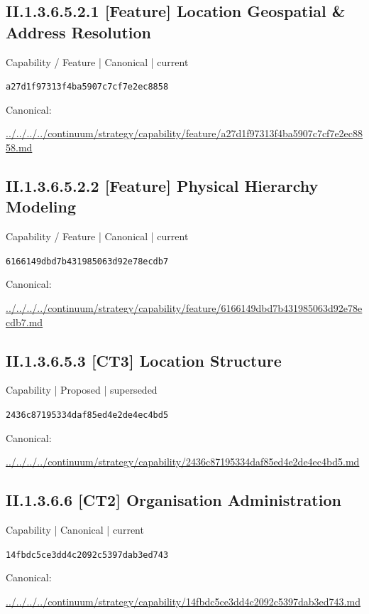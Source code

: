 \documentclass[10pt,a4paper]{article}
\begin{document}
\subsection*{II.1.3.6.5.2.1 [Feature] Location Geospatial \& Address Resolution}
{\small Capability / Feature | Canonical | current}\par
\texttt{a27d1f97313f4ba5907c7cf7e2ec8858}\par
Canonical: \par
{\footnotesize\url{../../../../continuum/strategy/capability/feature/a27d1f97313f4ba5907c7cf7e2ec8858.md}}\par
\subsection*{II.1.3.6.5.2.2 [Feature] Physical Hierarchy Modeling}
{\small Capability / Feature | Canonical | current}\par
\texttt{6166149dbd7b431985063d92e78ecdb7}\par
Canonical: \par
{\footnotesize\url{../../../../continuum/strategy/capability/feature/6166149dbd7b431985063d92e78ecdb7.md}}\par
\subsection*{II.1.3.6.5.3 [CT3] Location Structure}
{\small Capability | Proposed | superseded}\par
\texttt{2436c87195334daf85ed4e2de4ec4bd5}\par
Canonical: \par
{\footnotesize\url{../../../../continuum/strategy/capability/2436c87195334daf85ed4e2de4ec4bd5.md}}\par
\subsection*{II.1.3.6.6 [CT2] Organisation Administration}
{\small Capability | Canonical | current}\par
\texttt{14fbdc5ce3dd4c2092c5397dab3ed743}\par
Canonical: \par
{\footnotesize\url{../../../../continuum/strategy/capability/14fbdc5ce3dd4c2092c5397dab3ed743.md}}\par
\end{document}
